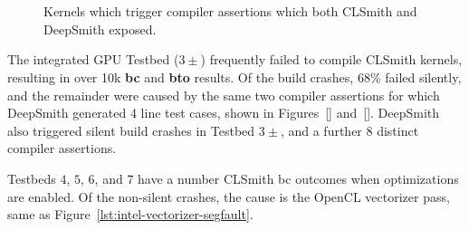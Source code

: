 

\begin{figure}
  \centering %
  \\%
  \\%
  \caption{Kernels which trigger compiler assertions which both CLSmith and DeepSmith exposed.}%
\end{figure}

The integrated GPU Testbed ($3\pm$) frequently failed to compile CLSmith kernels, resulting in over 10k \textbf{bc} and \textbf{bto} results.
Of the build crashes, 68\% failed silently, and the remainder were caused by the same two compiler assertions for which DeepSmith generated 4 line test cases, shown in Figures~\ref{} and~\ref{}. DeepSmith also triggered silent build crashes in Testbed $3\pm$, and a further 8 distinct compiler assertions.

Testbeds $4$, $5$, $6$, and $7$ have a number CLSmith bc outcomes when optimizations are enabled. Of the non-silent crashes, the cause is the OpenCL vectorizer pass, same as Figure~\ref{lst:intel-vectorizer-segfault}. 

